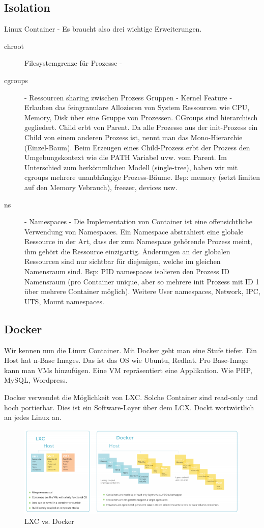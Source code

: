\subsection{Isolation}
Linux Container - Es braucht also drei wichtige Erweiterungen.
\begin{description}
	\item[chroot] Filesystemgrenze für Prozesse -
	\item[cgroups]  - Ressourcen sharing zwischen Prozess Gruppen - Kernel Feature - Erlauben das feingranulare Allozieren von System Ressourcen wie CPU, Memory, Disk über eine Gruppe von Prozessen. CGroups sind hierarchisch gegliedert. Child erbt von Parent. Da alle Prozesse aus der init-Prozess ein Child von einem anderen Prozess ist, nennt man das Mono-Hierarchie (Einzel-Baum).  Beim Erzeugen eines Child-Prozess erbt der Prozess den Umgebungskontext wie die PATH Variabel uvw. vom Parent. Im Unterschied zum herkömmlichen Modell (single-tree), haben wir mit cgroups mehrere unanbhängige Prozess-Bäume. Bsp: memory (setzt limiten auf den Memory Vebrauch), freezer, devices usw.
	\item[ns] - Namespaces - Die Implementation von Container ist eine offensichtliche Verwendung von Namespaces. Ein Namespace abstrahiert eine globale Ressource in der Art, dass der zum Namespace gehörende Prozess meint, ihm gehört die Ressource einzigartig. Änderungen an der globalen Ressourcen sind nur sichtbar für diejenigen, welche im gleichen Namensraum sind. Bsp: PID namespaces isolieren den Prozess ID Namensraum (pro Container unique, aber so mehrere init Prozess mit ID 1 über mehrere Container möglich). Weitere User namespaces, Network, IPC, UTS, Mount namespaces.
\end{description} 

\subsection{Docker}
Wir kennen nun die Linux Container. Mit Docker geht man eine Stufe tiefer. Ein Host hat n-Base Images. Das ist das OS wie Ubuntu, Redhat. Pro Base-Image kann man VMs hinzufügen. Eine VM repräsentiert eine Applikation. Wie PHP, MySQL, Wordpress.

Docker verwendet die Möglichkeit von LXC. Solche Container sind read-only und hoch portierbar. Dies ist ein Software-Layer über dem LCX. Dockt wortwörtlich an jedes Linux an.

\begin{figure}[h!]
\centering
\includegraphics[width=0.9\linewidth]{fig/lxc-vs-docker}
\caption{LXC vs. Docker}
\label{fig:lxc-vs-docker}
\end{figure}


